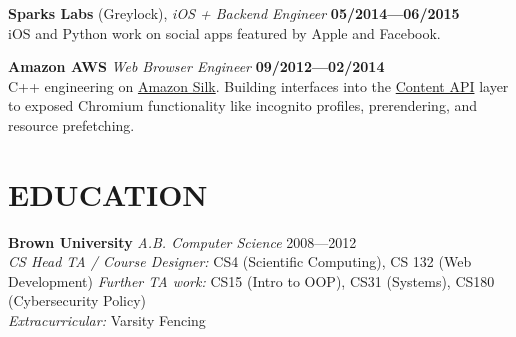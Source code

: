 \documentclass[line,margin]{res}
\begin{document}
\begin{resume}
    \textbf{Sparks Labs} (Greylock), {\sl iOS + Backend Engineer} \hfill \textbf{05/2014—06/2015} \\
    iOS and Python work on social apps featured by Apple and Facebook.

    \textbf{Amazon AWS} {\sl Web Browser Engineer} \hfill \textbf{09/2012—02/2014} \\
    C++ engineering on \href{https://en.wikipedia.org/wiki/Amazon_Silk}{Amazon Silk}. Building interfaces into the \href{https://chromium.googlesource.com/chromium/src/+/HEAD/content/public/README.md}{Content API} layer to exposed Chromium functionality like incognito profiles, prerendering, and resource prefetching.

\section{EDUCATION}
    \textbf{Brown University} {\sl A.B. Computer Science} \hfill 2008—2012 \\
    {\sl CS Head TA / Course Designer:} CS4 (Scientific Computing), CS 132 (Web Development)
    {\sl Further TA work:} CS15 (Intro to OOP), CS31 (Systems), CS180 (Cybersecurity Policy)\\
    {\sl Extracurricular:} Varsity Fencing

\end{resume}
\end{document}
